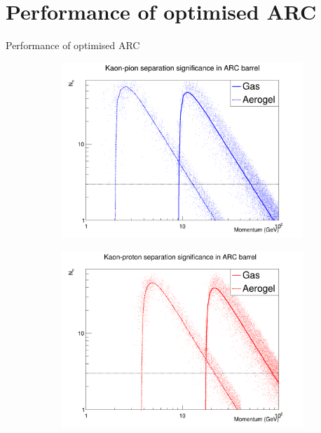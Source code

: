 \documentclass{beamer}
\begin{document}
\section{Performance of optimised ARC}
\begin{frame}{Performance of optimised ARC}
  \begin{figure}
    \centering
    \vspace{-0.2cm}
    \begin{subfigure}{0.5\textwidth}
      \includegraphics[width = 1.0\textwidth]{Plots/Significance_Scatter_PionKaon.png}
    \end{subfigure}%
    \begin{subfigure}{0.5\textwidth}
      \includegraphics[width = 1.0\textwidth]{Plots/Significance_Scatter_ProtonKaon.png}

\end{subfigure}
\end{figure}
\end{frame}
\end{document}
